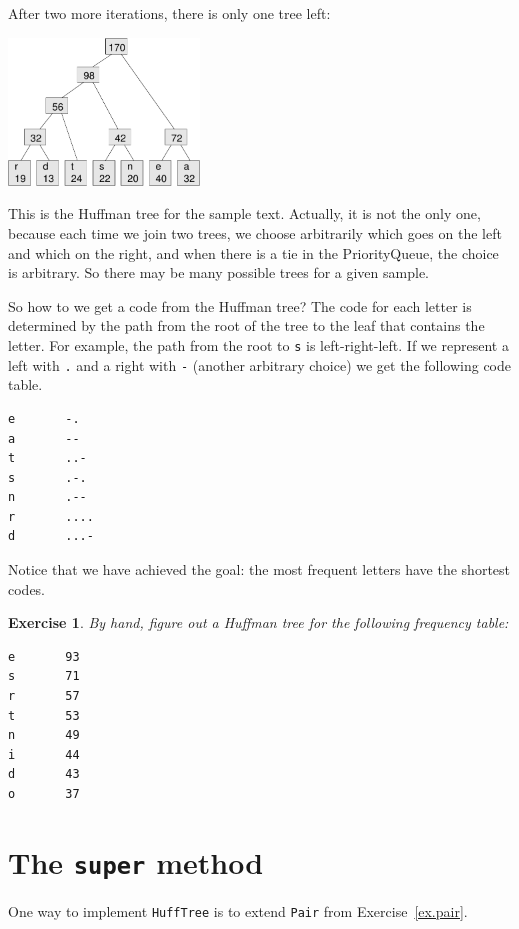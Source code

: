 \documentclass[12pt]{book}
\theoremstyle{exercise}
\newtheorem{exercise}{Exercise}[chapter]
\begin{document}

After two more iterations, there is only one tree left:

\includegraphics[width=2.0in]{figs/huff6.pdf}

This is the Huffman tree for the sample text.  Actually, it is not the
only one, because each time we join two trees, we choose arbitrarily
which goes on the left and which on the right, and when there is a tie
in the PriorityQueue, the choice is arbitrary.  So there may be many
possible trees for a given sample.

So how to we get a code from the Huffman tree?  The code
for each letter is determined by the path from the root of the tree
to the leaf that contains the letter.  For example, the path
from the root to {\tt s} is left-right-left.  If we represent
a left with {\tt .} and a right with {\tt -} (another arbitrary
choice) we get the following code table.

\begin{verbatim}
e       -.
a       --
t       ..-
s       .-.
n       .--
r       ....
d       ...-
\end{verbatim}

Notice that we have achieved the goal: the most frequent letters
have the shortest codes.

\begin{exercise}
By hand, figure out a Huffman tree for the following frequency
table:

\begin{verbatim}
e       93
s       71
r       57
t       53
n       49
i       44
d       43
o       37
\end{verbatim}
\end{exercise}


\section{The {\tt super} method}

One way to implement {\tt HuffTree} is to extend {\tt Pair}
from Exercise~\ref{ex.pair}.
\end{document}
